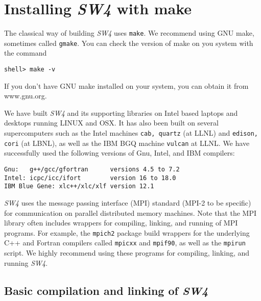 \documentclass[11pt]{article}
\begin{document}
\section{Installing \emph{SW4} with make}\label{cha:installing-sw4}


The classical way of building \emph{SW4} uses \verb+make+. We recommend using GNU make, sometimes called
\verb+gmake+. You can check the version of make on you system with the command
\begin{verbatim}
shell> make -v
\end{verbatim}
If you don't have GNU make installed on your system, you can obtain it from www.gnu.org.

We have built \emph{SW4} and its supporting libraries on Intel based laptops and desktops running
LINUX and OSX. It has also been built on several supercomputers such as the Intel machines {\tt cab,
quartz}
(at LLNL) and {\tt edison, cori} (at LBNL), as well as the IBM BGQ machine {\tt vulcan} at LLNL. We have
successfully used the following versions of Gnu, Intel, and IBM compilers:
\begin{verbatim}
Gnu:   g++/gcc/gfortran      versions 4.5 to 7.2
Intel: icpc/icc/ifort        version 16 to 18.0
IBM Blue Gene: xlc++/xlc/xlf version 12.1
\end{verbatim}

\emph{SW4} uses the message passing interface (MPI) standard (MPI-2 to be specific) for
communication on parallel distributed memory machines. Note that the MPI library often includes
wrappers for compiling, linking, and running of MPI programs. For example, the {\tt mpich2} package
build wrappers for the underlying C++ and Fortran compilers called {\tt mpicxx} and {\tt mpif90}, as
well as the {\tt mpirun} script. We highly recommend using these programs for compiling, linking,
and running \emph{SW4}.


\subsection{Basic compilation and linking of \emph{SW4}}\label{sec:basic-install}
\end{document}
